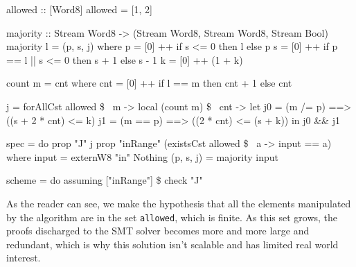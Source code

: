 \begin{code}
allowed :: [Word8]
allowed = [1, 2]

majority :: Stream Word8 -> (Stream Word8, Stream Word8, Stream Bool)
majority l = (p, s, j)
  where
    p  = [0] ++ if s <= 0 then l else p
    s  = [0] ++ if p == l || s <= 0 then s + 1 else s - 1
    k  = [0] ++ (1 + k)
    
    count m = cnt
      where cnt = [0] ++ if l == m then cnt + 1 else cnt
    
    j = forAllCst allowed \$ \ m ->
          local (count m) \$ \ cnt ->
          let j0 = (m /= p) ==> ((s + 2 * cnt) <= k)
              j1 = (m == p) ==> ((2 * cnt) <= (s + k))
          in j0 && j1

spec = do
  prop "J" j
  prop "inRange" (existsCst allowed \$ \ a -> input == a)
  where
    input = externW8 "in" Nothing
    (p, s, j) = majority input

scheme = do
  assuming ["inRange"] \$ check "J"
\end{code}
As the reader can see, we make the hypothesis that all the elements manipulated by the algorithm are in the set \texttt{allowed}, which is finite. As this set grows, the proofs discharged to the SMT solver becomes more and more large and redundant, which is why this solution isn't scalable and has limited real world interest.





